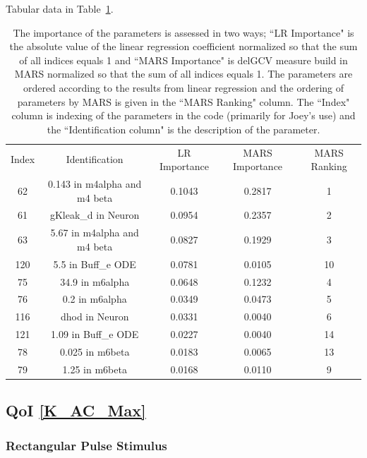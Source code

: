 \documentclass[12pt]{article}
\numberwithin{equation}{section}
\begin{document}
Tabular data in Table~\ref{qoi_K_ECS_Mean_ex}.


\begin{table}[h]
\centering
\begin{tabular}{ccccc}
Index & Identification & LR Importance & MARS Importance & MARS Ranking \\
62 & 0.143 in m4alpha and m4 beta &  0.1043 & 0.2817 & 1\\
61 & gKleak\_d in Neuron & 0.0954 & 0.2357 &  2\\
63 &   5.67 in m4alpha and m4 beta & 0.0827 & 0.1929 & 3\\
120 & 5.5 in Buff\_e ODE & 0.0781 & 0.0105 & 10\\
75 & 34.9 in m6alpha & 0.0648 & 0.1232 & 4\\
76 & 0.2 in m6alpha & 0.0349 & 0.0473 & 5\\
116 & dhod in Neuron & 0.0331 & 0.0040 & 6\\
121 & 1.09 in Buff\_e ODE & 0.0227 & 0.0040 & 14\\
78 & 0.025 in m6beta & 0.0183 &  0.0065 & 13\\
79 & 1.25 in m6beta & 0.0168 & 0.0110 & 9\\
\end{tabular}
\caption{The importance of the parameters is assessed in two ways; ``LR Importance" is the absolute value of the linear regression coefficient normalized so that the sum of all indices equals 1 and ``MARS Importance" is delGCV measure build in MARS normalized so that the sum of all indices equals 1. The parameters are ordered according to the results from linear regression and the ordering of parameters by MARS is given in the ``MARS Ranking" column. The ``Index" column is indexing of the parameters in the code (primarily for Joey's use) and the ``Identification column" is the description of the parameter.}
\label{qoi_K_ECS_Mean_ex}
\end{table}

\newpage
\subsection{QoI \eqref{K_AC_Max}}

\subsubsection{Rectangular Pulse Stimulus}
\end{document}
